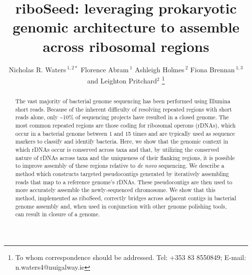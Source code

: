 \documentclass[a4,center,fleqn]{NAR}
\begin{document}
\title{riboSeed: leveraging prokaryotic genomic architecture to assemble across ribosomal regions}

\author{%
  Nicholas R. Waters\,$^{1,2\ast}$
  Florence Abram\,$^{1}$
  Ashleigh Holmes\,$^{2}$
  Fiona Brennan\,$^{1,3}$
  and Leighton Pritchard$^{2}$
  \footnote{To whom correspondence should be addressed.
    Tel: +353 83 8550849; E-mail: n.waters4@nuigalway.ie}
}
\address{
  $^{1}$Department of Microbiology, School of Natural Sciences, National University of Ireland, Galway, Ireland \\
  $^{2}$Information and Computational Sciences, James Hutton Institute, Invergowrie, Dundee DD2 5DA, Scotland\\
  $^{3}$Soil and Environmental Microbiology, Environmental Research Centre, Johnstown Castle, Wexford, Ireland
}


\maketitle

\begin{abstract}
The vast majority of bacterial genome sequencing has been performed using Illumina short reads. Because of the inherent difficulty of resolving repeated regions with short reads alone, only \textasciitilde10\% of sequencing projects have resulted in a closed genome. The most common repeated regions are those coding for ribosomal operons (rDNAs), which occur in a bacterial genome between 1 and 15 times and are typically used as sequence markers to classify and identify bacteria. Here, we show that the genomic context in which rDNAs occur is conserved across taxa and that, by utilizing the conserved nature of rDNAs across taxa and the uniqueness of their flanking regions, it is possible to improve assembly of these regions relative to \textit{de novo} sequencing. We describe a method which constructs targeted pseudocontigs generated by iteratively assembling reads that map to a reference genome's rDNAs. These pseudocontigs are then used to more accurately assemble the newly-sequenced chromosome. We show that this method, implemented as riboSeed, correctly bridges across adjacent contigs in bacterial genome assembly and, when used in conjunction with other genome polishing tools, can result in closure of a genome.
\end{abstract}
\end{document}
